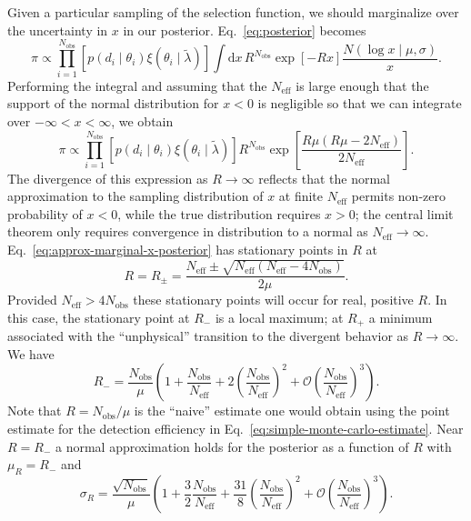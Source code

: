 \documentclass[modern]{aastex62}
\newcommand{\dd}{\mathrm{d}}
\newcommand{\Neff}{N_\mathrm{eff}}
\newcommand{\Nobs}{N_\mathrm{obs}}
\begin{document}
Given a particular sampling of the selection function, we should marginalize
over the uncertainty in $x$ in our posterior.  Eq.\ \eqref{eq:posterior} becomes
%
\begin{equation}
  \label{eq:posterior-integrated}
    \pi \propto \prod_{i = 1}^{\Nobs} \left[ p\left( d_i \mid \theta_i \right) \xi\left( \theta_i \mid \tilde{\lambda} \right) \right] \int \dd x \, R^{\Nobs} \exp\left[ -R x \right] \frac{N\left( \log x \mid \mu, \sigma\right)}{x}.
\end{equation}
%
Performing the integral and assuming that the $\Neff$ is large enough that the
support of the normal distribution for $x<0$ is negligible so that we can
integrate over $-\infty < x < \infty$, we obtain
%
\begin{equation}
  \label{eq:approx-marginal-x-posterior}
  \pi \propto \prod_{i = 1}^{\Nobs} \left[ p\left( d_i \mid \theta_i \right) \xi\left( \theta_i \mid \tilde{\lambda} \right) \right] R^{\Nobs} \exp\left[  \frac{R \mu \left( R\mu - 2 \Neff \right)}{2 \Neff} \right].
\end{equation}
%
The divergence of this expression as $R\to \infty$ reflects that the normal
approximation to the sampling distribution of $x$ at finite $\Neff$ permits
non-zero probability of $x < 0$, while the true distribution requires $x > 0$;
the central limit theorem only requires convergence in distribution to a normal
as $\Neff \to \infty$.  Eq.\ \eqref{eq:approx-marginal-x-posterior} has
stationary points in $R$ at
%
\begin{equation}
  R = R_{\pm} = \frac{\Neff \pm \sqrt{\Neff \left( \Neff - 4 \Nobs \right)}}{2 \mu}.
\end{equation}
%
Provided $\Neff > 4 \Nobs$ these stationary points will occur for real, positive
$R$.  In this case, the stationary point at $R_{-}$ is a local maximum; at
$R_{+}$ a minimum associated with the ``unphysical'' transition to the divergent
behavior as $R\to \infty$.  We have
%
\begin{equation}
  R_{-} = \frac{\Nobs}{\mu} \left( 1 + \frac{\Nobs}{\Neff} + 2 \left( \frac{\Nobs}{\Neff} \right)^2 + \mathcal{O}\left( \frac{\Nobs}{\Neff} \right)^3 \right).
\end{equation}
%
Note that $R = \Nobs / \mu$ is the ``naive'' estimate one would obtain using the
point estimate for the detection efficiency in Eq.\
\eqref{eq:simple-monte-carlo-estimate}.  Near $R = R_{-}$ a normal approximation
holds for the posterior as a function of $R$ with $\mu_R = R_{-}$ and
%
\begin{equation}
  \sigma_R = \frac{\sqrt{\Nobs}}{\mu} \left( 1 + \frac{3}{2} \frac{\Nobs}{\Neff} + \frac{31}{8} \left( \frac{\Nobs}{\Neff} \right)^2 + \mathcal{O} \left( \frac{\Nobs}{\Neff} \right)^3 \right).
\end{equation}
\end{document}
